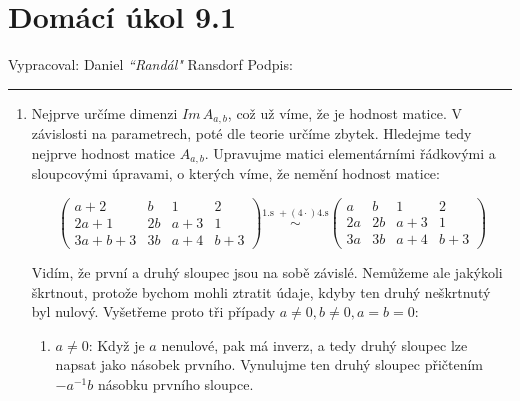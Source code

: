\documentclass[12pt]{article}
\begin{document}
\section*{Domácí úkol 9.1}

Vypracoval: Daniel \textit{``Randál"} Ransdorf \hfill Podpis: \rule{4cm}{0.4pt}

\begin{enumerate}
  
  \item Nejprve určíme dimenzi $Im\,A_{a,b}$, což už víme, že je hodnost matice. V závislosti na parametrech, poté dle teorie určíme zbytek.
    Hledejme tedy nejprve hodnost matice $A_{a,b}$. Upravujme matici elementárními řádkovými a sloupcovými úpravami, o kterých víme, že nemění hodnost matice:

    \[
      \left( \begin{array}{cccc}
        a+2 & b & 1 & 2 \\
        2a+1 & 2b & a+3 & 1 \\
        3a+b+3 & 3b & a+4 & b+3
      \end{array} \right)
      \overset{\text{1.s } + (4\cdot)\text{4.s}}{\sim}
      \left( \begin{array}{cccc}
        a & b & 1 & 2 \\
        2a & 2b & a+3 & 1 \\
        3a & 3b & a+4 & b+3
      \end{array} \right)
    \]

    Vidím, že první a druhý sloupec jsou na sobě závislé. Nemůžeme ale jakýkoli škrtnout, protože bychom mohli ztratit
    údaje, kdyby ten druhý neškrtnutý byl nulový. Vyšetřeme proto tři případy $a\neq0, b\neq0, a=b=0$:
    \begin{enumerate}
      \item $a\neq0$: Když je $a$ nenulové, pak má inverz, a tedy druhý sloupec lze napsat jako násobek prvního.
        Vynulujme ten druhý sloupec přičtením $-a^{-1}b$ násobku prvního sloupce.


\end{enumerate}
\end{enumerate}
\end{document}
